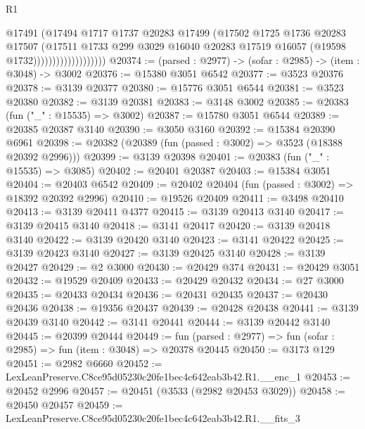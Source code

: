 \begin{lexlean}{R1}
\begin{coremodule}
                                  @17491
                                  (@17494
                                    @1717
                                    @1737
                                    @20283
                                    @17499
                                    (@17502
                                      @1725
                                      @1736
                                      @20283
                                      @17507
                                      (@17511
                                        @1733
                                        @299
                                        @3029
                                        @16040
                                        @20283
                                        @17519
                                        @16057
                                        (@19598 @1732)))))))))))))))))))
@20374 := (parsed : @2977) -> (sofar : @2985) -> (item : @3048) -> @3002
@20376 := @15380 @3051 @6542
@20377 := @3523 @20376
@20378 := @3139 @20377
@20380 := @15776 @3051 @6544
@20381 := @3523 @20380
@20382 := @3139 @20381
@20383 := @3148 @3002
@20385 := @20383 (fun ("_" : @15535) => @3002)
@20387 := @15780 @3051 @6544
@20389 := @20385 @20387 @3140
@20390 := @3050 @3160
@20392 := @15384 @20390 @6961
@20398 := @20382 (@20389 (fun (passed : @3002) => @3523 (@18388 @20392 @2996)))
@20399 := @3139 @20398
@20401 := @20383 (fun ("_" : @15535) => @3085)
@20402 := @20401 @20387
@20403 := @15384 @3051
@20404 := @20403 @6542
@20409 := @20402 @20404 (fun (passed : @3002) => @18392 @20392 @2996)
@20410 := @19526 @20409
@20411 := @3498 @20410
@20413 := @3139 @20411 @4377
@20415 := @3139 @20413 @3140
@20417 := @3139 @20415 @3140
@20418 := @3141 @20417
@20420 := @3139 @20418 @3140
@20422 := @3139 @20420 @3140
@20423 := @3141 @20422
@20425 := @3139 @20423 @3140
@20427 := @3139 @20425 @3140
@20428 := @3139 @20427
@20429 := @2 @3000
@20430 := @20429 @374
@20431 := @20429 @3051
@20432 := @19529 @20409
@20433 := @20429 @20432
@20434 := @27 @3000
@20435 := @20433 @20434
@20436 := @20431 @20435
@20437 := @20430 @20436
@20438 := @19356 @20437
@20439 := @20428 @20438
@20441 := @3139 @20439 @3140
@20442 := @3141 @20441
@20444 := @3139 @20442 @3140
@20445 := @20399 @20444
@20449 := fun (parsed : @2977) => fun (sofar : @2985) => fun (item : @3048) => @20378 @20445
@20450 := @3173 @129
@20451 := @2982 @6660
@20452 := LexLeanPreserve.C8ce95d05230c20fe1bec4c642eab3b42.R1.__enc_1
@20453 := @20452 @2996
@20457 := @20451 (@3533 (@2982 @20453 @3029))
@20458 := @20450 @20457
@20459 := LexLeanPreserve.C8ce95d05230c20fe1bec4c642eab3b42.R1.__fits_3

\end{coremodule}
\end{lexlean}
